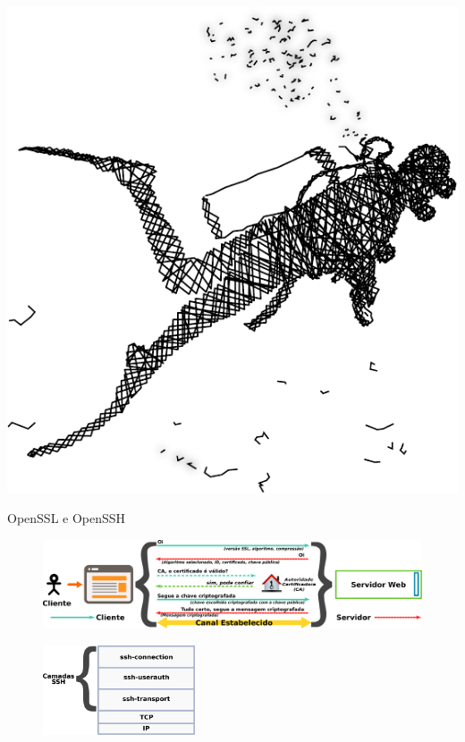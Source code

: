 \documentclass[xcolor={usenames,svgnames,dvipsnames},brazil,english,12pt,aspectratio=149]{beamer}
\begin{document}
\begin{frame}[plain]
  \centering
  \includegraphics[width=.6\textwidth]{presentation_cap3_sec2}
\end{frame}

\begin{frame}{OpenSSL e OpenSSH}
  \begin{figure}[!h]
    \centering
    \includegraphics[width=\textwidth]{ssl_handshake}
  \end{figure}

  \begin{figure}[!h]
    \centering
    \includegraphics[width=0.4\textwidth]{ssh_layers}
  \end{figure}
\end{frame}
\end{document}

